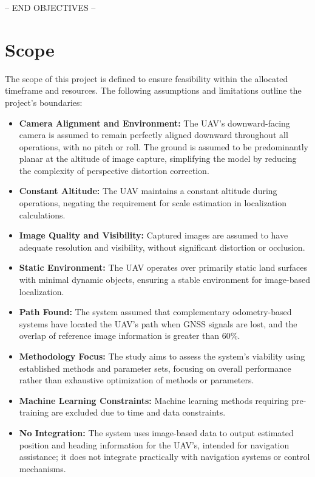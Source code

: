 -- END OBJECTIVES --

\section{Scope}
\label{sec:scope}
The scope of this project is defined to ensure feasibility within the allocated timeframe and resources. The following assumptions and limitations outline the project's boundaries:

\begin{itemize}
    \item \textbf{Camera Alignment and Environment:} The UAV's downward-facing camera is assumed to remain perfectly aligned downward throughout all operations, with no pitch or roll. The ground is assumed to be predominantly planar at the altitude of image capture, simplifying the model by reducing the complexity of perspective distortion correction.
    \item \textbf{Constant Altitude:} The UAV maintains a constant altitude during operations, negating the requirement for scale estimation in localization calculations.
    \item \textbf{Image Quality and Visibility:} Captured images are assumed to have adequate resolution and visibility, without significant distortion or occlusion.
    \item \textbf{Static Environment:} The UAV operates over primarily static land surfaces with minimal dynamic objects, ensuring a stable environment for image-based localization.
    \item \textbf{Path Found:} The system assumed that complementary odometry-based systems have located the UAV's path when GNSS signals are lost, and the overlap of reference image information is greater than 60\%.
    \item \textbf{Methodology Focus:} The study aims to assess the system's viability using established methods and parameter sets, focusing on overall performance rather than exhaustive optimization of methods or parameters.
    \item \textbf{Machine Learning Constraints:} Machine learning methods requiring pre-training are excluded due to time and data constraints. 
    \item \textbf{No Integration:} The system uses image-based data to output estimated position and heading information for the UAV's, intended for navigation assistance; it does not integrate practically with navigation systems or control mechanisms.
    
\end{itemize}


